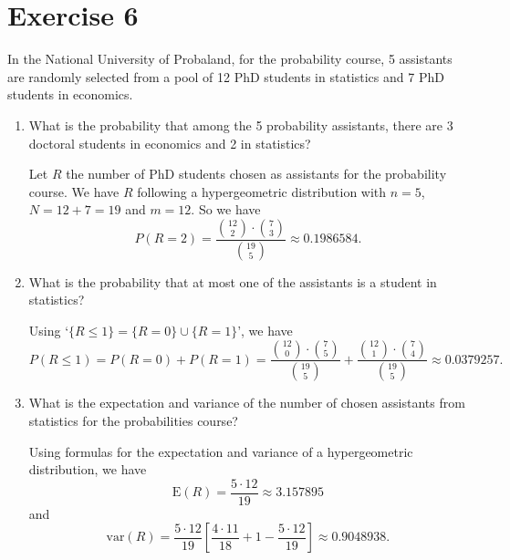 \documentclass[12pt,thmsa]{article}\usepackage[]{graphicx}\usepackage[]{color}
\begin{document}
\section*{Exercise 6}

In the National University of Probaland, for the probability course, 5 assistants are randomly selected from a pool of 12 PhD students in statistics and 7 PhD students in economics.

\begin{enumerate}
\item What is the probability that among the 5 probability assistants, there are 3 doctoral students in economics and 2 in statistics?

Let $ R $ the number of PhD students chosen as assistants for the probability course. We have $ R $ following a hypergeometric distribution with $n=5$, $N=12+7=19$ and $m=12$. So we have
\begin{equation*}
P(R=2)=   \frac{\binom{12}{2} \cdot \binom{7}{3}}{\binom{19}{5}} \approx 0.1986584.
\end{equation*}

\item What is the probability that at most one of the assistants is a student in statistics?

Using `$\{R\leq 1\}=\{R=0\}\cup\{R= 1\}$', we have
\begin{equation*}
P(R\leq 1)= P(R=0)+P(R=1) = \frac{\binom{12}{0}  \cdot \binom{7}{5}}{\binom{19}{5}} + \frac{\binom{12}{1}  \cdot \binom{7}{4}}{\binom{19}{5}} \approx 0.0379257.
\end{equation*}
\item What is the expectation and variance of the number of chosen assistants from statistics for the probabilities course?

Using formulas for the expectation and variance of a
hypergeometric distribution, we have
$$
\text{E}(R) = \frac{5\cdot 12}{19} \approx 3.157895
$$
and
$$
\text{var}(R) =   \frac{5\cdot 12}{19}\left[\frac{4\cdot 11}{18}+1-\frac{5\cdot 12}{19}\right] \approx 0.9048938.
$$
\end{enumerate}
\end{document}
